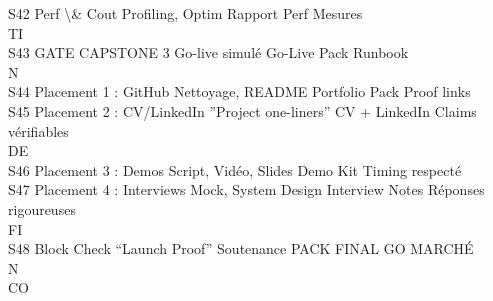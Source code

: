 S42    Perf \textbackslash{}& Cout                         Profiling, Optim             Rapport Perf           Mesures\\
\vspace{0.5em}
\vspace{0.5em}
\vspace{0.5em}
\vspace{0.5em}
TI\\
S43    GATE CAPSTONE 3                     Go-live simulé               Go-Live Pack           Runbook\\
\vspace{0.5em}
\vspace{0.5em}
\vspace{0.5em}
\vspace{0.5em}
N\\
S44    Placement 1 : GitHub                Nettoyage, README            Portfolio Pack         Proof links\\
S45    Placement 2 : CV/LinkedIn           ”Project one-liners”         CV + LinkedIn          Claims vérifiables\\
\vspace{0.5em}
\vspace{0.5em}
\vspace{0.5em}
\vspace{0.5em}
DE\\
S46    Placement 3 : Demos                 Script, Vidéo, Slides        Demo Kit               Timing respecté\\
S47    Placement 4 : Interviews            Mock, System Design          Interview Notes        Réponses rigoureuses\\
\vspace{0.5em}
\vspace{0.5em}
\vspace{0.5em}
\vspace{0.5em}
FI\\
S48    Block Check “Launch Proof”          Soutenance                   PACK FINAL             GO MARCHÉ\\
\vspace{0.5em}
\vspace{0.5em}
\vspace{0.5em}
\vspace{0.5em}
N\\
CO\\
\vspace{0.5em}
\vspace{0.5em}
\vspace{0.5em}
